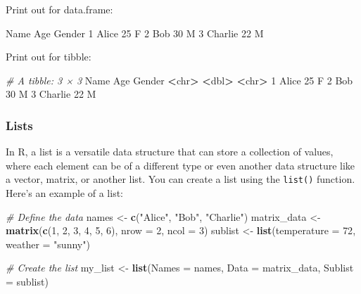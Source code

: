 \documentclass[
]{book}
\newenvironment{Shaded}{\begin{snugshade}}{\end{snugshade}}
\newcommand{\AttributeTok}[1]{\textcolor[rgb]{0.13,0.29,0.53}{#1}}
\newcommand{\CommentTok}[1]{\textcolor[rgb]{0.56,0.35,0.01}{\textit{#1}}}
\newcommand{\DecValTok}[1]{\textcolor[rgb]{0.00,0.00,0.81}{#1}}
\newcommand{\ErrorTok}[1]{\textcolor[rgb]{0.64,0.00,0.00}{\textbf{#1}}}
\newcommand{\FunctionTok}[1]{\textcolor[rgb]{0.13,0.29,0.53}{\textbf{#1}}}
\newcommand{\NormalTok}[1]{#1}
\newcommand{\OtherTok}[1]{\textcolor[rgb]{0.56,0.35,0.01}{#1}}
\newcommand{\SpecialCharTok}[1]{\textcolor[rgb]{0.81,0.36,0.00}{\textbf{#1}}}
\newcommand{\StringTok}[1]{\textcolor[rgb]{0.31,0.60,0.02}{#1}}
\begin{document}
Print out for data.frame:

\begin{Shaded}
\begin{Highlighting}[]
\NormalTok{     Name Age Gender}
\DecValTok{1}\NormalTok{   Alice  }\DecValTok{25}\NormalTok{      F}
\DecValTok{2}\NormalTok{     Bob  }\DecValTok{30}\NormalTok{      M}
\DecValTok{3}\NormalTok{ Charlie  }\DecValTok{22}\NormalTok{      M}
\end{Highlighting}
\end{Shaded}

Print out for tibble:

\begin{Shaded}
\begin{Highlighting}[]
\CommentTok{\# A tibble: 3 × 3}
\NormalTok{  Name     Age Gender}
  \SpecialCharTok{\textless{}}\NormalTok{chr}\SpecialCharTok{\textgreater{}}  \ErrorTok{\textless{}}\NormalTok{dbl}\SpecialCharTok{\textgreater{}} \ErrorTok{\textless{}}\NormalTok{chr}\SpecialCharTok{\textgreater{}} 
\DecValTok{1}\NormalTok{ Alice     }\DecValTok{25}\NormalTok{ F     }
\DecValTok{2}\NormalTok{ Bob       }\DecValTok{30}\NormalTok{ M     }
\DecValTok{3}\NormalTok{ Charlie   }\DecValTok{22}\NormalTok{ M     }
\end{Highlighting}
\end{Shaded}

\hypertarget{lists}{%
\subsubsection{Lists}\label{lists}}

In R, a list is a versatile data structure that can store a collection of values, where each element can be of a different type or even another data structure like a vector, matrix, or another list. You can create a list using the \texttt{list()} function. Here's an example of a list:

\begin{Shaded}
\begin{Highlighting}[]
\CommentTok{\# Define the data}
\NormalTok{names }\OtherTok{\textless{}{-}} \FunctionTok{c}\NormalTok{(}\StringTok{"Alice"}\NormalTok{, }\StringTok{"Bob"}\NormalTok{, }\StringTok{"Charlie"}\NormalTok{)}
\NormalTok{matrix\_data }\OtherTok{\textless{}{-}} \FunctionTok{matrix}\NormalTok{(}\FunctionTok{c}\NormalTok{(}\DecValTok{1}\NormalTok{, }\DecValTok{2}\NormalTok{, }\DecValTok{3}\NormalTok{, }\DecValTok{4}\NormalTok{, }\DecValTok{5}\NormalTok{, }\DecValTok{6}\NormalTok{), }\AttributeTok{nrow =} \DecValTok{2}\NormalTok{, }\AttributeTok{ncol =} \DecValTok{3}\NormalTok{)}
\NormalTok{sublist }\OtherTok{\textless{}{-}} \FunctionTok{list}\NormalTok{(}\AttributeTok{temperature =} \DecValTok{72}\NormalTok{, }\AttributeTok{weather =} \StringTok{"sunny"}\NormalTok{)}

\CommentTok{\# Create the list}
\NormalTok{my\_list }\OtherTok{\textless{}{-}} \FunctionTok{list}\NormalTok{(}\AttributeTok{Names =}\NormalTok{ names, }\AttributeTok{Data =}\NormalTok{ matrix\_data, }\AttributeTok{Sublist =}\NormalTok{ sublist)}
\end{Highlighting}
\end{Shaded}
\end{document}
